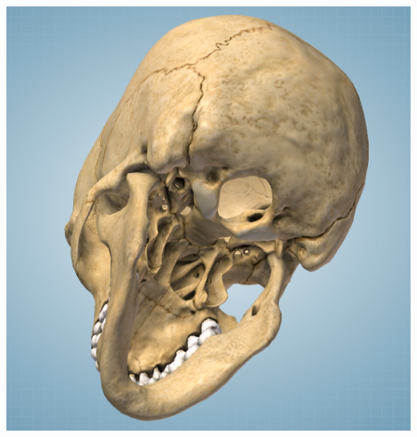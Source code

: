 \begin{frame}
\begin{columns}
    \begin{column}{0.2\textwidth}
      \includegraphics[width=.9\textwidth]{images/skull}\\
      \bigskip

\end{column}
\end{columns}
\end{frame}
